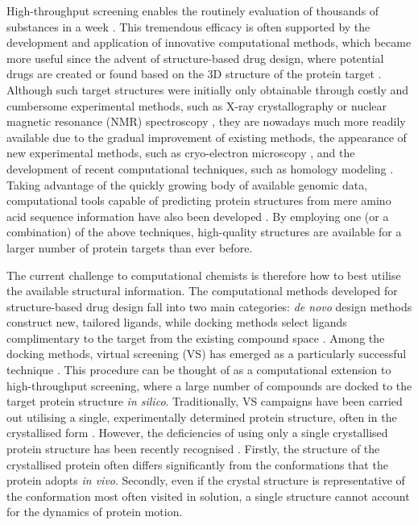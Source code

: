 High-throughput screening enables the routinely evaluation of thousands of substances in a week \cite{hts}. This tremendous efficacy is often supported by the development and application of innovative computational methods, which became more useful since the advent of structure-based drug design, where potential drugs are created or found based on the 3D structure of the protein target \cite{drug_design_book,structure-based}. Although such target structures were initially only obtainable through costly and cumbersome experimental methods, such as X-ray crystallography \cite{xray} or nuclear magnetic resonance (NMR) spectroscopy \cite{nmr}, they are nowadays much more readily available due to the gradual improvement of existing methods, the appearance of new experimental methods, such as cryo-electron microscopy \cite{cryo-electron}, and the development of recent computational techniques, such as homology modeling \cite{genome3d}. Taking advantage of the quickly growing body of available genomic data, computational tools capable of predicting protein structures from mere amino acid sequence information have also been developed \cite{ensembler, alphafold}. By employing one (or a combination) of the above techniques, high-quality structures are available for a larger number of protein targets than ever before.

The current challenge to computational chemists is therefore how to best utilise the available structural information.
The computational methods developed for structure-based drug design fall into two main categories: {\it de novo} design methods construct new, tailored ligands, while docking methods select ligands complimentary to the target from the existing compound space \cite{docking_to_ensemble}.
Among the docking methods, virtual screening (VS) has emerged as a particularly successful technique \cite{vina_theory_practice, virtual_screening}. This procedure can be thought of as a computational extension to high-throughput screening, where a large number of compounds are docked to the target protein structure {\it in silico}. Traditionally, VS campaigns have been carried out utilising a single, experimentally determined protein structure, often in the crystallised form \cite{docking_to_ensemble,ensemble_discovery}. However, the deficiencies of using only a single crystallised protein structure has been recently recognised \cite{docking_to_ensemble,ensemble_discovery,enrichment,protein_flexibility,protein_flexibility2}. Firstly, the structure of the crystallised protein often differs significantly from the conformations that the protein adopts {\it in vivo}. Secondly, even if the crystal structure is representative of the conformation most often visited in solution, a single structure cannot account for the dynamics of protein motion. 

